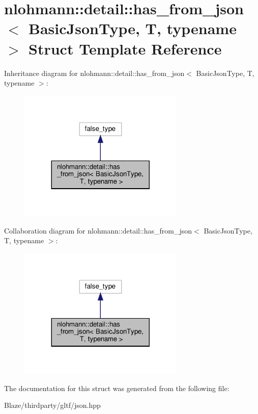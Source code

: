 \hypertarget{structnlohmann_1_1detail_1_1has__from__json}{}\section{nlohmann\+:\+:detail\+:\+:has\+\_\+from\+\_\+json$<$ Basic\+Json\+Type, T, typename $>$ Struct Template Reference}
\label{structnlohmann_1_1detail_1_1has__from__json}


Inheritance diagram for nlohmann\+:\+:detail\+:\+:has\+\_\+from\+\_\+json$<$ Basic\+Json\+Type, T, typename $>$\+:\nopagebreak
\begin{figure}[H]
\begin{center}
\leavevmode
\includegraphics[width=224pt]{structnlohmann_1_1detail_1_1has__from__json__inherit__graph}
\end{center}
\end{figure}


Collaboration diagram for nlohmann\+:\+:detail\+:\+:has\+\_\+from\+\_\+json$<$ Basic\+Json\+Type, T, typename $>$\+:\nopagebreak
\begin{figure}[H]
\begin{center}
\leavevmode
\includegraphics[width=224pt]{structnlohmann_1_1detail_1_1has__from__json__coll__graph}
\end{center}
\end{figure}


The documentation for this struct was generated from the following file\+:\begin{DoxyCompactItemize}
\item 
Blaze/thirdparty/gltf/json.\+hpp\end{DoxyCompactItemize}
